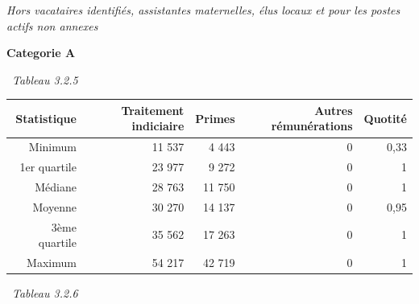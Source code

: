 \emph{Hors vacataires identifiés, assistantes maternelles, élus locaux
et pour les postes actifs non annexes}

\textbf{Categorie A}

~\emph{Tableau 3.2.5}

\begin{longtable}[]{@{}rrrrr@{}}
\toprule
Statistique & Traitement indiciaire & Primes & Autres rémunérations &
Quotité\tabularnewline
\midrule
\endhead
Minimum & 11 537 & 4 443 & 0 & 0,33\tabularnewline
1er quartile & 23 977 & 9 272 & 0 & 1\tabularnewline
Médiane & 28 763 & 11 750 & 0 & 1\tabularnewline
Moyenne & 30 270 & 14 137 & 0 & 0,95\tabularnewline
3ème quartile & 35 562 & 17 263 & 0 & 1\tabularnewline
Maximum & 54 217 & 42 719 & 0 & 1\tabularnewline
\bottomrule
\end{longtable}

~\emph{Tableau 3.2.6}

